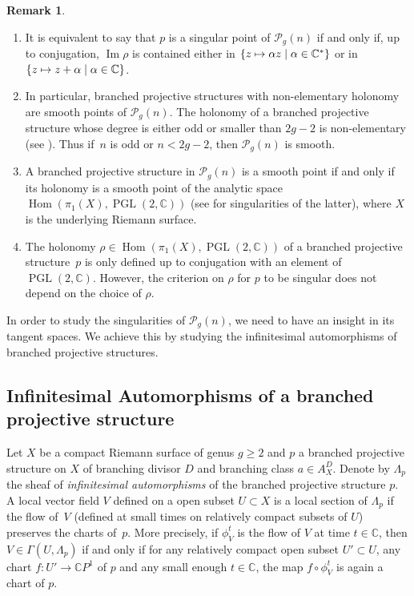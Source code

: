 \documentclass[10pt]{amsart}
\newcommand{\skpt}{\par\smallskip}
\let\Subsection\subsection
\newcommand\mto{\mathchoice{\longmapsto}{\mapsto}{\mapsto}{\mapsto}}
\newcommand{\C}{\mathbb C}
\newcommand{\CP}{\mathbb CP}
\DeclareMathOperator{\Hom}{Hom}
\DeclareMathOperator{\Image}{Im}
\DeclareMathOperator{\PGL}{PGL}
\theoremstyle{definition}
\newtheorem{remark}[definition]{Remark}
\theoremstyle{plain}
\begin{document}
\skpt
\begin{remark}
\begin{enumerate}
\item
It is equivalent to say that $p$ is a singular point of $\mathcal P_g(n)$ if and only if, up to conjugation, $\Image \rho$ is contained either in $\{z \mto \alpha z\mid \alpha \in \C^*\}$ or in $\{z \mto z + \alpha\mid \alpha \in \C\}$.
\item
In particular, branched projective structures with non-elementary holonomy are smooth points of $\mathcal P_g(n)$.
The holonomy of a branched projective structure whose degree is either odd or smaller than $2g-2$ is non-elementary (see \cite{gallo-kapovich-marden}).
Thus if~$n$ is odd or $n < 2g-2$, then $\mathcal P_g(n)$ is smooth.
\item
A branched projective structure in $\mathcal P_g(n)$ is a smooth point if and only if its holonomy is a smooth point of the analytic space $\Hom(\pi_1(X), \PGL(2, \C))$ (see \cite{hubbard} for singularities of the latter), where $X$ is the underlying Riemann surface.
\item
The holonomy $\rho \in \Hom(\pi_1(X), \PGL(2, \C))$ of a branched projective structure~$p$ is only defined up to conjugation with an element of $\PGL(2, \C)$.
However, the criterion on $\rho$ for $p$ to be singular does not depend on the choice of $\rho$.
\end{enumerate}
\end{remark}

In order to study the singularities of $\mathcal P_g(n)$, we need to have an insight in its tangent spaces.
We achieve this by studying the infinitesimal automorphisms of branched projective structures.

\Subsection{Infinitesimal Automorphisms of a branched projective structure}\label{subsection_infinitesimal_automorphisms}

Let $X$ be a compact Riemann surface of genus $g \ge 2$ and $p$ a branched projective structure on $X$ of branching divisor $D$ and branching class $a \in A_X^D$.
Denote by $\Lambda_p$ the sheaf of \emph{infinitesimal automorphisms} of the branched projective structure $p$.
A local vector field $V$ defined on a open subset $U \subset X$ is a local section of $\Lambda_p$ if the flow of~$V$ (defined at small times on relatively compact subsets of $U$) preserves the charts of~$p$.
More precisely, if $\phi_V^t$ is the flow of $V$ at time $t \in \C$, then $V \in \Gamma\left(U, \Lambda_p\right)$ if and only if for any relatively compact open subset $U' \subset U$, any chart $f: U' \to \CP^1$ of $p$ and any small enough $t \in \C$, the map $f \circ \phi_V^t$ is again a chart of $p$.
\end{document}
